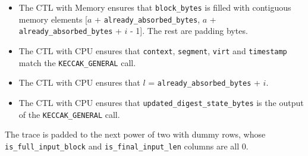 \begin{itemize}
    \begin{itemize}
        \item The CTL with Memory ensures that \texttt{block\_bytes} is filled with contiguous memory elements [$a$ + \texttt{already\_absorbed\_bytes}, $a$ + \texttt{already\_absorbed\_bytes} + $i$ - 1]. The rest are padding bytes.
        \item The CTL with CPU ensures that \texttt{context}, \texttt{segment}, \texttt{virt} and \texttt{timestamp} match the \texttt{KECCAK\_GENERAL} call.
        \item The CTL with CPU ensures that $l$ = \texttt{already\_absorbed\_bytes} + $i$.
        \item The CTL with CPU ensures that \texttt{updated\_digest\_state\_bytes} is the output of the \texttt{KECCAK\_GENERAL} call.
    \end{itemize}
\end{itemize}

The trace is padded to the next power of two with dummy rows, whose \texttt{is\_full\_input\_block} and \texttt{is\_final\_input\_len} columns are all 0.
